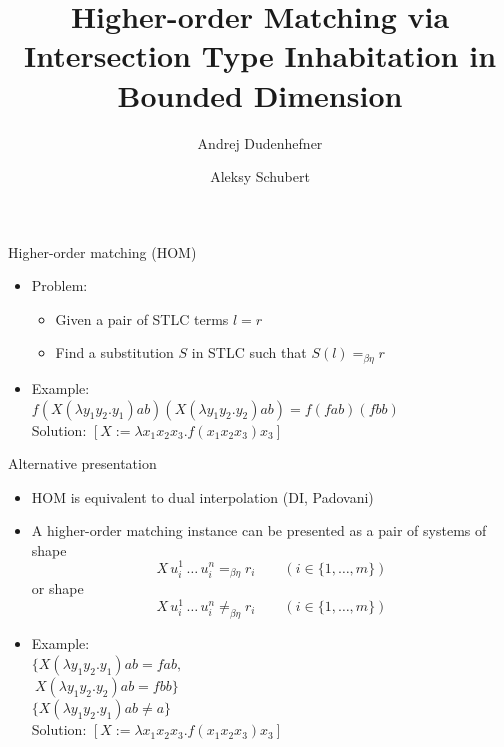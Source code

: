 \documentclass{beamer}
\title{Higher-order Matching via Intersection Type Inhabitation in Bounded Dimension}
\author{Andrej Dudenhefner \and Aleksy Schubert}
\date{}
\renewcommand{\:}{\mbox{\,:\,}\xspace}
\begin{document}
\frame{\titlepage}


\begin{frame}{Higher-order matching (HOM)}
\begin{itemize}
    \item Problem:
      \begin{itemize}
      \item Given a pair of STLC terms $l = r$
      \item Find a substitution $S$ in STLC such that $S(l) =_{\beta\eta} r$
      \end{itemize}
    \item Example:\\
      $f(X(\lambda y_1y_2.y_1)ab)(X(\lambda y_1y_2.y_2)ab) = f(fab)(fbb)$\\[1ex]
      Solution: $[X := \lambda x_1x_2x_3.f(x_1x_2x_3)x_3]$
\end{itemize}
\end{frame}


\begin{frame}{Alternative presentation}
\begin{itemize}
    \item HOM is equivalent to dual interpolation (DI, Padovani)
    \item A higher-order matching instance can be presented as a pair of systems
      of shape
      \begin{equation}\label{eq:hom}
        X\,u_i^1\,\ldots\,u_i^n =_{\beta\eta} r_i \qquad (i \in \{1, \ldots, m\})
      \end{equation}
      or shape
      \begin{equation}\label{neq:hom}
        X\,u_i^1\,\ldots\,u_i^n \neq_{\beta\eta} r_i \qquad (i \in \{1, \ldots, m\})
      \end{equation}

    \item Example:\\
      $\{X(\lambda y_1y_2.y_1)ab = fab,$\\
      $~X(\lambda y_1y_2.y_2)ab = fbb\}$\\[1ex]
      $\{X(\lambda y_1y_2.y_1)ab \not= a\}$\\[1ex]
      Solution: $[X := \lambda x_1x_2x_3.f(x_1x_2x_3)x_3]$
\end{itemize}
\end{frame}
\end{document}
